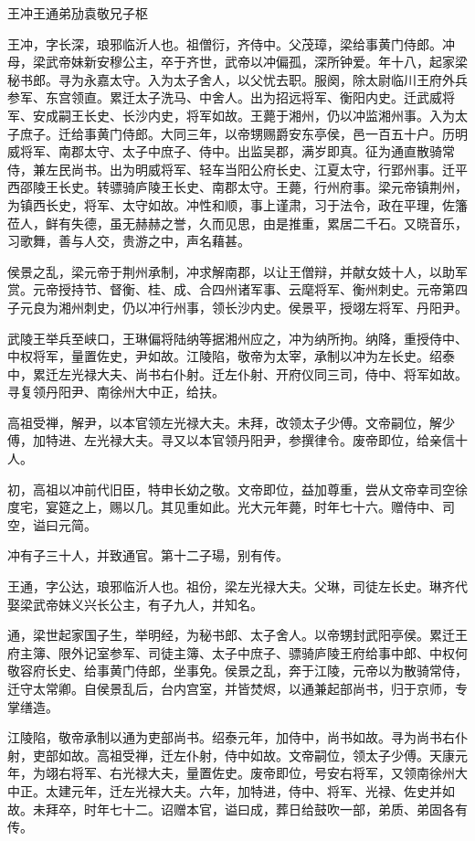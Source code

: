 \documentclass[]{article}
\begin{document}
王冲王通弟劢袁敬兄子枢

王冲，字长深，琅邪临沂人也。祖僧衍，齐侍中。父茂璋，梁给事黄门侍郎。冲母，梁武帝妹新安穆公主，卒于齐世，武帝以冲偏孤，深所钟爱。年十八，起家梁秘书郎。寻为永嘉太守。入为太子舍人，以父忧去职。服阕，除太尉临川王府外兵参军、东宫领直。累迁太子洗马、中舍人。出为招远将军、衡阳内史。迁武威将军、安成嗣王长史、长沙内史，将军如故。王薨于湘州，仍以冲监湘州事。入为太子庶子。迁给事黄门侍郎。大同三年，以帝甥赐爵安东亭侯，邑一百五十户。历明威将军、南郡太守、太子中庶子、侍中。出监吴郡，满岁即真。征为通直散骑常侍，兼左民尚书。出为明威将军、轻车当阳公府长史、江夏太守，行郢州事。迁平西邵陵王长史。转骠骑庐陵王长史、南郡太守。王薨，行州府事。梁元帝镇荆州，为镇西长史，将军、太守如故。冲性和顺，事上谨肃，习于法令，政在平理，佐籓莅人，鲜有失德，虽无赫赫之誉，久而见思，由是推重，累居二千石。又晓音乐，习歌舞，善与人交，贵游之中，声名藉甚。

侯景之乱，梁元帝于荆州承制，冲求解南郡，以让王僧辩，并献女妓十人，以助军赏。元帝授持节、督衡、桂、成、合四州诸军事、云麾将军、衡州刺史。元帝第四子元良为湘州刺史，仍以冲行州事，领长沙内史。侯景平，授翊左将军、丹阳尹。

武陵王举兵至峡口，王琳偏将陆纳等据湘州应之，冲为纳所拘。纳降，重授侍中、中权将军，量置佐史，尹如故。江陵陷，敬帝为太宰，承制以冲为左长史。绍泰中，累迁左光禄大夫、尚书右仆射。迁左仆射、开府仪同三司，侍中、将军如故。寻复领丹阳尹、南徐州大中正，给扶。

高祖受禅，解尹，以本官领左光禄大夫。未拜，改领太子少傅。文帝嗣位，解少傅，加特进、左光禄大夫。寻又以本官领丹阳尹，参撰律令。废帝即位，给亲信十人。

初，高祖以冲前代旧臣，特申长幼之敬。文帝即位，益加尊重，尝从文帝幸司空徐度宅，宴筵之上，赐以几。其见重如此。光大元年薨，时年七十六。赠侍中、司空，谥曰元简。

冲有子三十人，并致通官。第十二子瑒，别有传。

王通，字公达，琅邪临沂人也。祖份，梁左光禄大夫。父琳，司徒左长史。琳齐代娶梁武帝妹义兴长公主，有子九人，并知名。

通，梁世起家国子生，举明经，为秘书郎、太子舍人。以帝甥封武阳亭侯。累迁王府主簿、限外记室参军、司徒主簿、太子中庶子、骠骑庐陵王府给事中郎、中权何敬容府长史、给事黄门侍郎，坐事免。侯景之乱，奔于江陵，元帝以为散骑常侍，迁守太常卿。自侯景乱后，台内宫室，并皆焚烬，以通兼起部尚书，归于京师，专掌缮造。

江陵陷，敬帝承制以通为吏部尚书。绍泰元年，加侍中，尚书如故。寻为尚书右仆射，吏部如故。高祖受禅，迁左仆射，侍中如故。文帝嗣位，领太子少傅。天康元年，为翊右将军、右光禄大夫，量置佐史。废帝即位，号安右将军，又领南徐州大中正。太建元年，迁左光禄大夫。六年，加特进，侍中、将军、光禄、佐史并如故。未拜卒，时年七十二。诏赠本官，谥曰成，葬日给鼓吹一部，弟质、弟固各有传。
\end{document}
